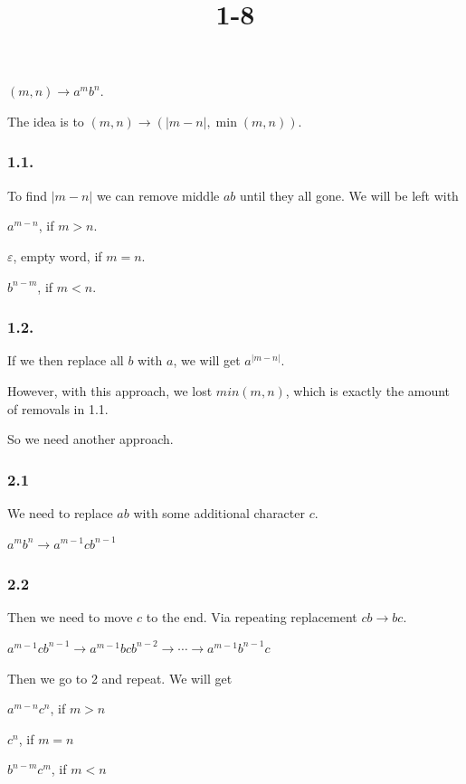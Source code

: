 \documentclass{article}
\title{1-8}
\begin{document}
\maketitle

$(m, n) \to a^mb^n$.

The idea is to $(m, n) \to (|m - n|, \min(m, n))$.

\subsubsection*{1.1.}

To find $| m - n |$ we can remove middle $ab$ until they all gone. We will be left with

\item $a^{m-n}$, if $m > n$.
\item $\varepsilon$, empty word, if $m = n$.
\item $b^{n-m}$, if $m < n$.

\subsubsection*{1.2.}

If we then replace all $b$ with $a$, we will get $a^{|m-n|}$.

However, with this approach, we lost $min(m, n)$, which is exactly the amount of removals in 1.1.

So we need another approach.

\subsubsection*{2.1}

We need to replace $ab$ with some additional character $c$.

$a^mb^n \to a^{m-1}cb^{n-1}$

\subsubsection*{2.2}

Then we need to move $c$ to the end. Via repeating replacement $cb \to bc$.

$a^{m-1}cb^{n-1} \to a^{m-1}bcb^{n-2} \to \cdots \to a^{m-1}b^{n-1}c$

Then we go to 2 and repeat. We will get

\item $a^{m-n}c^n$, if $m > n$
\item $c^n$, if $m = n$
\item $b^{n-m}c^m$, if $m < n$
\end{document}
